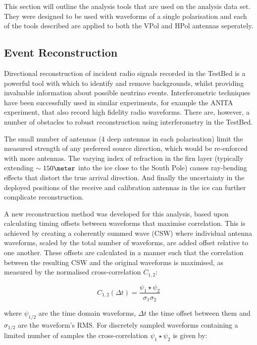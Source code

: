 This section will outline the analysis tools that are used on the analysis data set. They were designed to be used with waveforms of a single polarisation and each of the tools described are applied to both the VPol and HPol antennas seperately.


\subsection{Event Reconstruction}
\label{sec:Analysis:Reconstruction}

Directional reconstruction of incident radio signals recorded in the TestBed is a powerful tool with which to identify and remove backgrounds, whilst providing invaluable information about possible neutrino events. Interferometric techniques have been successfully used in similar experiments, for example the ANITA experiment, that also record high fidelity radio waveforms. There are, however, a number of obstacles to robust reconstruction using interferometry in the TestBed. 

The small number of antennas (4 deep antennas in each polarisation) limit the measured strength of any preferred source direction, which would be re-enforced with more antennas. The varying index of refraction in the firn layer (typically extending $\sim 150 \meter$ into the ice close to the South Pole) causes ray-bending effects that distort the true arrival direction. And finally the uncertainty in the deployed positions of the receive and calibration antennas in the ice can further complicate reconstruction. 


A new reconstruction method was developed for this analysis, based upon calculating timing offsets between waveforms that maximise correlation. This is achieved by creating a coherently summed wave (CSW) where individual antenna waveforms, scaled by the total number of waveforms, are added offset relative to one another. These offsets are calculated in a manner such that the correlation between the resulting CSW and the original waveforms is maximised, as measured by the normalised cross-correlation $C_{1,2}$:


\begin{equation}
  C_{1,2}(\Delta t) = \frac{\psi_{1} \star \psi_{2}}{\sigma_{1} \sigma_{2}}
  \label{eq:analysis:Reconstruction:Normalised-Cross-Correlation}
\end{equation}

\noindent where $\psi_{1/2}$ are the time domain waveforms, $\Delta t$ the time offset between them and $\sigma_{1/2}$ are the waveform's RMS. For discretely sampled waveforms containing a limited number of samples the cross-correlation $\psi_{1} \star \psi_{2}$ is given by:

